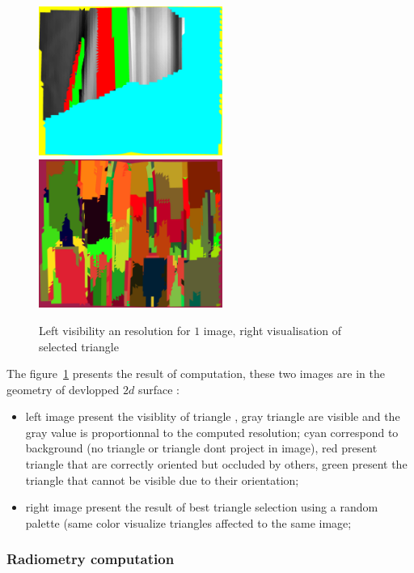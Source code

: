 \begin{figure}
\centering
\includegraphics[width=6cm]{CommandReferences/ImagesComRef/Dev-P1056148.jpg}
\includegraphics[width=6cm]{CommandReferences/ImagesComRef/LabTri.jpg}
\caption{Left visibility an resolution for $1$ image, right visualisation of selected triangle}
\label{fig:RealDevTri}
\end{figure}

The figure~\ref{fig:RealDevTri} presents the result of computation, these two images are in the
geometry of devlopped $2d$ surface :

\begin{itemize}
    \item left  image present the visiblity of triangle , gray triangle are visible and the gray value is
          proportionnal to the computed resolution; cyan correspond to background (no triangle or triangle
          dont project in image),  red present triangle that are correctly oriented but occluded by others,
          green present the triangle that cannot be visible due to their orientation;

    \item right image present the result of best triangle selection using a random palette (same color
          visualize triangles affected to the same image;

\end{itemize}


\subsubsection{Radiometry computation}

